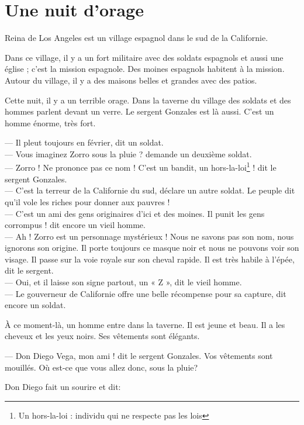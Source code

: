 \chapter{Une nuit d'orage}
Reina de Los Angeles est un village espagnol dans le sud de la Californie.

Dans ce village, il y a un fort militaire avec des soldats espagnols et aussi une église ; c'est la mission espagnole. Des moines
espagnols habitent à la mission. Autour du village, il y a des maisons belles et grandes avec des patios.

Cette nuit, il y a un terrible orage. Dans la taverne du village des soldats et des hommes parlent devant un verre. Le sergent
Gonzales est là aussi. C'est un homme énorme, très fort.

--- Il pleut toujours en février, dit un soldat.\\
--- Vous imaginez Zorro sous la pluie ? demande un deuxième soldat.\\
--- Zorro ! Ne prononce pas ce nom ! C'est un bandit, un hors-la-loi\footnote{Un hors-la-loi : individu qui ne respecte pas les
    lois} ! dit le sergent Gonzales.\\
--- C'est la terreur de la Californie du sud, déclare un autre soldat. Le peuple dit qu'il vole les riches pour donner aux
    pauvres !\\
--- C'est un ami des gens originaires d'ici et des moines. Il punit les gens corrompus ! dit encore un vieil homme.\\
--- Ah ! Zorro est un personnage mystérieux ! Nous ne savons pas son nom, nous ignorons son origine. Il porte toujours ce masque
    noir et nous ne pouvons voir son visage. Il passe sur la voie royale sur son cheval rapide. Il est très habile à l'épée, dit
    le sergent.\\
--- Oui, et il laisse son signe partout, un « Z », dit le vieil homme.\\
--- Le gouverneur de Californie offre une belle récompense pour sa capture, dit encore un soldat.

À ce moment-là, un homme entre dans la taverne. Il est jeune et beau. Il a les cheveux et les yeux noirs. Ses vêtements sont
élégants.

--- Don Diego Vega, mon ami ! dit le sergent Gonzales. Vos vêtements sont mouillés. Où est-ce que vous allez donc, sous la pluie?

Don Diego fait un sourire et dit:

